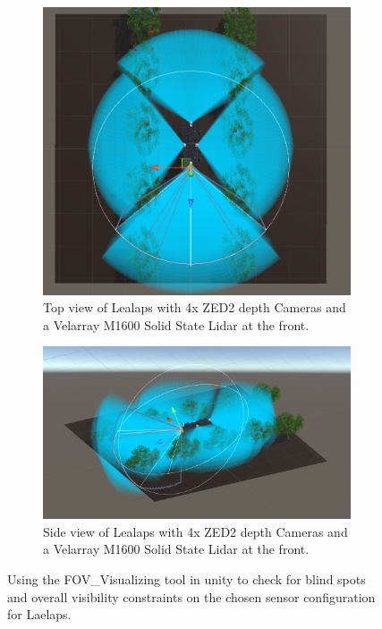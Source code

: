 \documentclass{article}
\begin{document}
\begin{enumerate}
\begin{figure}
\centering
\begin{subfigure}[htbp]{1\textwidth}
   \centering
   \includegraphics[width=0.8\linewidth]{FOV(29).png}
   \caption{Top view of Lealaps with 4x ZED2 depth Cameras and a Velarray M1600 Solid State Lidar at the front.}
\end{subfigure}
\begin{subfigure}[htbp]{1\textwidth}
   \centering
   \includegraphics[width=0.8\linewidth]{FOV(30).png}
   \caption{Side view of Lealaps with 4x ZED2 depth Cameras and a Velarray M1600 Solid State Lidar at the front.}
\end{subfigure}
\caption[]{Using the FOV\_Visualizing tool in unity to check for blind spots and overall visibility constraints on the chosen sensor configuration for Laelaps.}
\end{figure}

\clearpage
\end{enumerate}
\printbibliography %
\end{document}
